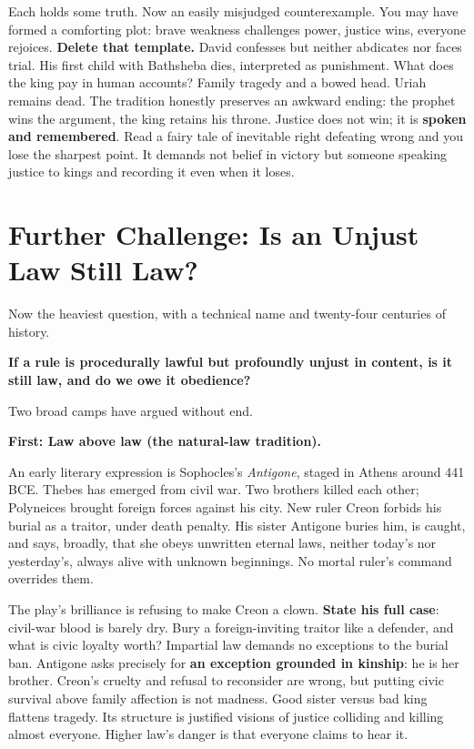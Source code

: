 Each holds some truth. Now an easily misjudged counterexample. You may have formed a comforting plot: brave weakness challenges power, justice wins, everyone rejoices. \textbf{Delete that template.} David confesses but neither abdicates nor faces trial. His first child with Bathsheba dies, interpreted as punishment. What does the king pay in human accounts? Family tragedy and a bowed head. Uriah remains dead. The tradition honestly preserves an awkward ending: the prophet wins the argument, the king retains his throne. Justice does not win; it is \textbf{spoken and remembered}. Read a fairy tale of inevitable right defeating wrong and you lose the sharpest point. It demands not belief in victory but someone speaking justice to kings and recording it even when it loses.

\section[Further Challenge: Is Unjust Law Law?]{Further Challenge: Is an Unjust Law Still Law?}
Now the heaviest question, with a technical name and twenty-four centuries of history.

\textbf{If a rule is procedurally lawful but profoundly unjust in content, is it still law, and do we owe it obedience?}

Two broad camps have argued without end.

\textbf{First: Law above law (the natural-law tradition).}

An early literary expression is Sophocles's \textit{Antigone}, staged in Athens around 441 BCE. Thebes has emerged from civil war. Two brothers killed each other; Polyneices brought foreign forces against his city. New ruler Creon forbids his burial as a traitor, under death penalty. His sister Antigone buries him, is caught, and says, broadly, that she obeys unwritten eternal laws, neither today's nor yesterday's, always alive with unknown beginnings. No mortal ruler's command overrides them.

The play's brilliance is refusing to make Creon a clown. \textbf{State his full case}: civil-war blood is barely dry. Bury a foreign-inviting traitor like a defender, and what is civic loyalty worth? Impartial law demands no exceptions to the burial ban. Antigone asks precisely for \textbf{an exception grounded in kinship}: he is her brother. Creon's cruelty and refusal to reconsider are wrong, but putting civic survival above family affection is not madness. Good sister versus bad king flattens tragedy. Its structure is justified visions of justice colliding and killing almost everyone. Higher law's danger is that everyone claims to hear it.

